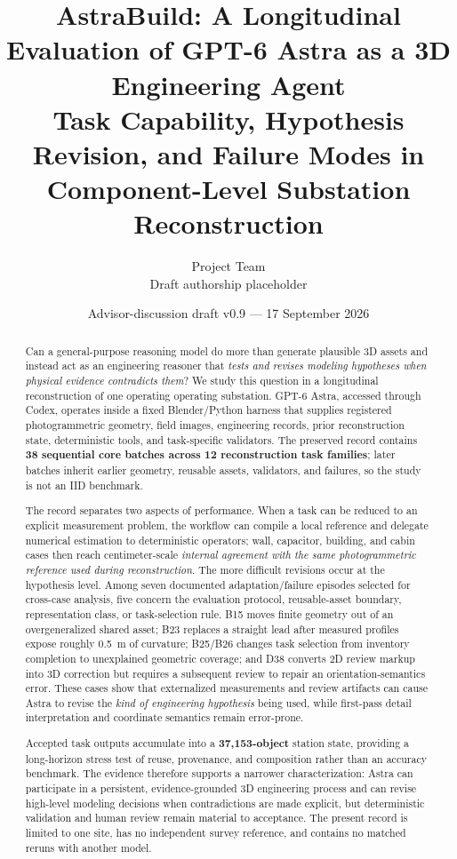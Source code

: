 \documentclass[10pt]{article}
\title{\textbf{AstraBuild: A Longitudinal Evaluation of GPT-6 Astra as a 3D Engineering Agent}\\\large Task Capability, Hypothesis Revision, and Failure Modes in Component-Level Substation Reconstruction}
\author{Project Team\\\small Draft authorship placeholder}
\date{Advisor-discussion draft v0.9 --- 17 September 2026}
\begin{document}
\maketitle

\begin{abstract}
Can a general-purpose reasoning model do more than generate plausible 3D assets and instead act as an engineering reasoner that \emph{tests and revises modeling hypotheses when physical evidence contradicts them}? We study this question in a longitudinal reconstruction of one operating operating substation. GPT-6 Astra, accessed through Codex, operates inside a fixed Blender/Python harness that supplies registered photogrammetric geometry, field images, engineering records, prior reconstruction state, deterministic tools, and task-specific validators. The preserved record contains \textbf{38 sequential core batches across 12 reconstruction task families}; later batches inherit earlier geometry, reusable assets, validators, and failures, so the study is not an IID benchmark.

The record separates two aspects of performance. When a task can be reduced to an explicit measurement problem, the workflow can compile a local reference and delegate numerical estimation to deterministic operators; wall, capacitor, building, and cabin cases then reach centimeter-scale \emph{internal agreement with the same photogrammetric reference used during reconstruction}. The more difficult revisions occur at the hypothesis level. Among seven documented adaptation/failure episodes selected for cross-case analysis, five concern the evaluation protocol, reusable-asset boundary, representation class, or task-selection rule. B15 moves finite geometry out of an overgeneralized shared asset; B23 replaces a straight lead after measured profiles expose roughly 0.5~m of curvature; B25/B26 changes task selection from inventory completion to unexplained geometric coverage; and D38 converts 2D review markup into 3D correction but requires a subsequent review to repair an orientation-semantics error. These cases show that externalized measurements and review artifacts can cause Astra to revise the \emph{kind of engineering hypothesis} being used, while first-pass detail interpretation and coordinate semantics remain error-prone.

Accepted task outputs accumulate into a \textbf{37,153-object} station state, providing a long-horizon stress test of reuse, provenance, and composition rather than an accuracy benchmark. The evidence therefore supports a narrower characterization: Astra can participate in a persistent, evidence-grounded 3D engineering process and can revise high-level modeling decisions when contradictions are made explicit, but deterministic validation and human review remain material to acceptance. The present record is limited to one site, has no independent survey reference, and contains no matched reruns with another model.
\end{abstract}
\end{document}
